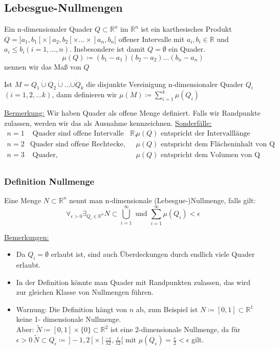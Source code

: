 \subsection{Lebesgue-Nullmengen}
Ein n-dimensionaler Quader $Q \subset \mathbb{R}^n$ im $\mathbb{R}^n$ ist ein karthesisches Produkt $Q = ]a_1,b_1[ \times ]a_2,b_2[ \times ... \times ]a_n,b_n[$ offener Intervalle mit $a_i,b_i \in \mathbb{R}$ und $a_i \leq b_i (i=1,...,n)$. Insbesondere ist damit $Q = \emptyset$ ein Quader.
\[ \mu(Q)\coloneqq (b_1 - a_1)(b_2 - a_2)...(b_n - a_n)\] nennen wir das Maß von $Q$

Ist $M = Q_1 \dot\cup Q_2 \dot{\cup} ... \dot{\cup Q_k}$ die disjunkte Vereinigung n-dimensionaler Quader $Q_i$ $(i=1,2,...k)$, dann definieren wir $\mu(M)\coloneqq \sum_{i=1}^{k} \mu(Q_i)$

\underline{Bermerkung:}
Wir haben Quader als offene Menge definiert. Falls wir Randpunkte zulassen, werden wir das als Ausnahme kennzeichnen.
\underline{Sonderfälle:}
\begin{equation*}
	\begin{matrix}
		n=1 &\text{ Quader sind offene Intervalle des } \mathbb{R}, & \mu(Q) \text{ entspricht der Intervalllänge}\\
		n=2 & \text{Quader sind offene Rechtecke, } & \mu(Q) \text{ entspricht dem Flächeninhalt von Q}\\
		n=3 &\text{ Quader, } & \mu(Q) \text{ entspricht dem Volumen von Q}\\
	\end{matrix}
\end{equation*}


\subsubsection{Definition Nullmenge}
Eine Menge $N \subset \mathbb{R}^n$ nennt man n-dimensionale (Lebesgue-)Nullmenge, falls gilt:
\[\forall_{\epsilon > 0} \exists_{Q_i \in \mathbb{R}^n} N \subset \bigcup_{i =1}^{\infty} \text{ und } \sum_{i=1}^{\infty} \mu(Q_i) < \epsilon\]

\underline{Bemerkungen:}
\begin{itemize}
	\item Da $Q_i = \emptyset$ erlaubt ist, sind auch Überdeckungen durch endlich viele Quader erlaubt.
	\item In der Definition könnte man Quader mit Randpunkten zulassen, das wird zur gleichen Klasse von Nullmengen führen.
	\item Warnung: Die Definition hängt von $n$ ab, zum Beispiel ist $N\coloneqq [0,1] \subset \mathbb{R}^1$ keine 1- dimensionale Nullmenge.\\
	Aber: $\tilde{N}\coloneqq[0,1]\times\{0\}\subset\mathbb{R}^2$ ist eine 2-dimensionale Nullmenge, da für $\epsilon > 0 \, \tilde{N}\subset Q_{\epsilon}\coloneqq\, ]-1,2[ \times ]\frac{-\epsilon}{12}, \frac{\epsilon}{12}[ \text{ mit } \mu(Q_{\epsilon}) = \frac{\epsilon}{2} < \epsilon$ gilt.
\end{itemize}

